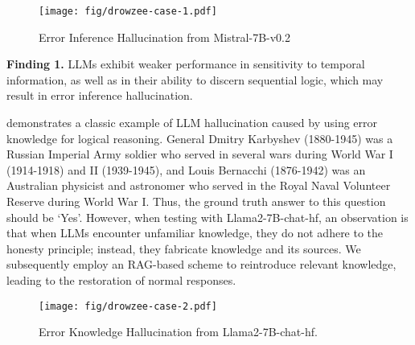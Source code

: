 \begin{figure}
\centering
\texttt{[image: fig/drowzee-case-1.pdf]}\\%
\caption{Error Inference Hallucination from Mistral-7B-v0.2}
\label{fig:case1}
\end{figure}

\begin{tcolorbox}
\vspace{-0.15cm}
\textbf{Finding 1.} LLMs exhibit weaker performance in sensitivity to temporal information, as well as in their ability to discern sequential logic, which may result in error inference hallucination.
\vspace{-0.15cm}
\end{tcolorbox}

 demonstrates a classic example of LLM hallucination caused by using error knowledge for logical reasoning. General Dmitry Karbyshev (1880-1945) was a Russian Imperial Army soldier who served in several wars during World War I (1914-1918) and II (1939-1945), and Louis Bernacchi (1876-1942) was an Australian physicist and astronomer who served in the Royal Naval Volunteer Reserve during World War I. Thus, the ground truth answer to this question should be `Yes'. 
However, when testing with Llama2-7B-chat-hf, an %
observation is that when LLMs encounter unfamiliar knowledge, they do not adhere to the honesty principle; instead, they fabricate knowledge and its sources. We subsequently employ an RAG-based scheme to reintroduce relevant knowledge, leading to the restoration of normal responses.
\begin{figure}
    \centering
    \small
    \texttt{[image: fig/drowzee-case-2.pdf]}\\%
    \caption{Error Knowledge Hallucination from Llama2-7B-chat-hf.}
\vspace{-0.3cm}
\label{fig:case2}
\end{figure}

